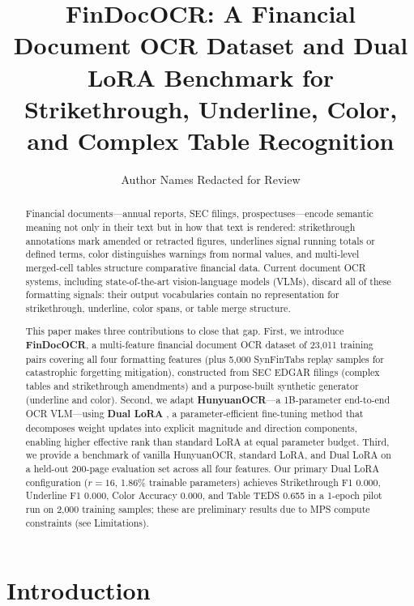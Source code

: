 \documentclass[10pt,twocolumn]{article}
\title{FinDocOCR: A Financial Document OCR Dataset and Dual LoRA Benchmark
       for Strikethrough, Underline, Color, and Complex Table Recognition}
\author{
  Author Names Redacted for Review
}
\date{}
\begin{document}
\maketitle

\begin{abstract}
Financial documents---annual reports, SEC filings, prospectuses---encode
semantic meaning not only in their text but in how that text is rendered:
strikethrough annotations mark amended or retracted figures, underlines signal
running totals or defined terms, color distinguishes warnings from normal
values, and multi-level merged-cell tables structure comparative financial data.
Current document OCR systems, including state-of-the-art vision-language models
(VLMs), discard all of these formatting signals: their output vocabularies
contain no representation for strikethrough, underline, color spans, or table
merge structure.

This paper makes three contributions to close that gap.
First, we introduce \textbf{FinDocOCR}, a multi-feature financial document OCR
dataset of 23{,}011 training pairs covering all four formatting features (plus
5{,}000 SynFinTabs replay samples for catastrophic forgetting mitigation),
constructed from SEC EDGAR filings (complex tables and strikethrough amendments)
and a purpose-built synthetic generator (underline and color).
Second, we adapt \textbf{HunyuanOCR}---a 1B-parameter end-to-end OCR
VLM---using \textbf{Dual LoRA} \cite{xu2025duallora}, a parameter-efficient
fine-tuning method that decomposes weight updates into explicit magnitude and
direction components, enabling higher effective rank than standard LoRA at equal
parameter budget.
Third, we provide a benchmark of vanilla HunyuanOCR, standard LoRA, and Dual
LoRA on a held-out 200-page evaluation set across all four features. Our
primary Dual LoRA configuration ($r{=}16$, 1.86\% trainable parameters) achieves
Strikethrough F1 0.000, Underline F1 0.000, Color Accuracy 0.000, and Table
TEDS 0.655 in a 1-epoch pilot run on 2{,}000 training samples; these are
preliminary results due to MPS compute constraints (see Limitations).
\end{abstract}

\section{Introduction}
\label{sec:intro}
\end{document}
